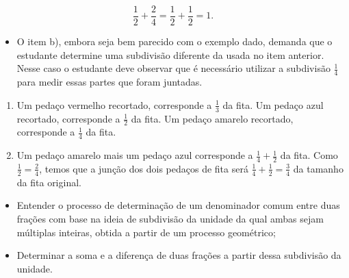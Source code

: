 \begin{multicols}{2}
\begin{orientacoes}{}{}
  $$ \frac{1}{2} + \frac{2}{4} = \frac{1}{2} + \frac{1}{2} = 1.$$
\begin{itemize} %
    \item       O item b), embora seja bem parecido com o exemplo dado, demanda que o estudante determine uma subdivisão diferente da usada no item anterior. Nesse caso o estudante deve observar que é necessário utilizar a subdivisão       $\frac{1}{4}$       para medir essas partes que foram juntadas.
\end{itemize} %
\end{orientacoes}
\clearpage

\begin{solucao}{}{}
\begin{enumerate} [\quad a)] %
    \item       Um pedaço vermelho recortado, corresponde a       $\frac{1}{3}$       da fita.       \mbox{} \newline        Um pedaço azul recortado, corresponde a       $\frac{1}{2}$       da fita.       \mbox{} \newline        Um pedaço amarelo recortado, corresponde a       $\frac{1}{4}$       da fita.
  \pagebreak
  \item       Um pedaço amarelo mais um pedaço azul corresponde a       $\frac{1}{4} +\frac{1}{2}$       da fita. Como       $\frac{1}{2} =\frac{2}{4}$, temos que a junção dos dois pedaços de fita será       $\frac{1}{4} +\frac{1}{2} = \frac{3}{4}$       da tamanho da fita original.
\end{enumerate} %

\end{solucao}

\begin{objetivos}[label=chap5-ativ3]{}{}

\begin{itemize} %
  \item     Entender o processo de determinação de um denominador comum entre duas frações com base na ideia de subdivisão da unidade da qual ambas sejam múltiplas inteiras, obtida a partir de um processo geométrico;
  \item     Determinar a soma e a diferença de duas frações a partir dessa subdivisão da unidade.
\end{itemize} %
\end{objetivos}


\end{multicols}
